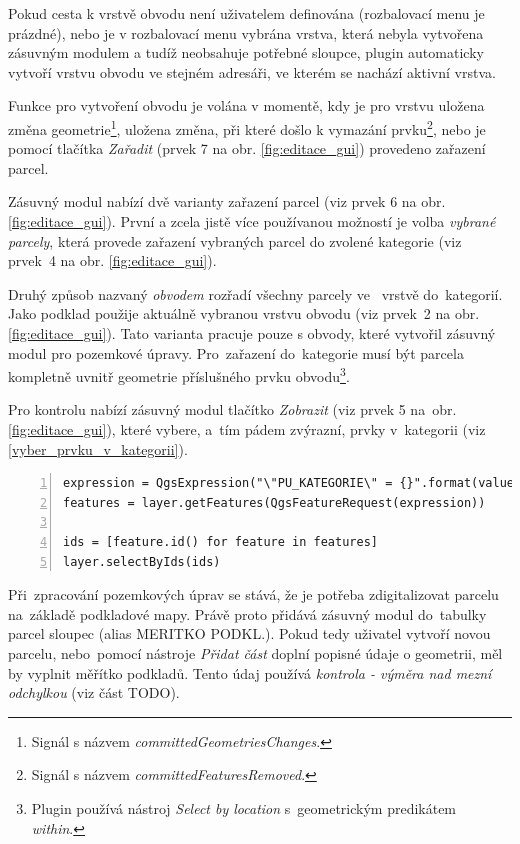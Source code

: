 Pokud cesta k vrstvě obvodu není uživatelem definována (rozbalovací menu je prázdné), nebo je v rozbalovací menu vybrána vrstva, která nebyla vytvořena zásuvným modulem a tudíž neobsahuje potřebné sloupce, plugin automaticky vytvoří vrstvu obvodu ve stejném adresáři, ve kterém se nachází aktivní  vrstva.

Funkce pro vytvoření obvodu je volána v momentě, kdy je pro vrstvu  uložena změna geometrie\footnote{Signál s názvem \textit{committedGeometriesChanges}.}, uložena změna, při které došlo k vymazání prvku\footnote{Signál s názvem \textit{committedFeaturesRemoved}.}, nebo je pomocí tlačítka \textit{Zařadit} (prvek 7 na obr. \ref{fig:editace_gui}) provedeno zařazení parcel.

Zásuvný modul nabízí dvě varianty zařazení parcel (viz prvek 6 na obr. \ref{fig:editace_gui}). První a zcela jistě více používanou možností je volba \textit{vybrané parcely}, která provede zařazení vybraných parcel do zvolené kategorie (viz prvek~4 na obr. \ref{fig:editace_gui}).

Druhý způsob nazvaný \textit{obvodem} rozřadí všechny parcely ve~ vrstvě do~kategorií. Jako podklad použije aktuálně vybranou vrstvu obvodu (viz prvek~2 na obr. \ref{fig:editace_gui}). Tato varianta pracuje pouze s obvody, které vytvořil zásuvný modul pro pozemkové úpravy. Pro~zařazení do~kategorie musí být parcela kompletně uvnitř geometrie příslušného prvku obvodu\footnote{Plugin používá nástroj \textit{Select by location} s~geometrickým predikátem \textit{within}.}.

Pro kontrolu nabízí zásuvný modul tlačítko \textit{Zobrazit} (viz prvek 5 na~obr. \ref{fig:editace_gui}), které vybere, a~tím pádem zvýrazní, prvky v~kategorii (viz \ref{vyber_prvku_v_kategorii}).

{\scriptsize
\begin{lstlisting}[style=python, caption={Výběr prvků v kategorii parcel}, captionpos=b, label=vyber_prvku_v_kategorii, backgroundcolor = \color{light-gray},  numbers=left]
expression = QgsExpression("\"PU_KATEGORIE\" = {}".format(value))
features = layer.getFeatures(QgsFeatureRequest(expression))

ids = [feature.id() for feature in features]
layer.selectByIds(ids)
\end{lstlisting}}

Při~zpracování pozemkových úprav se stává, že je potřeba zdigitalizovat parcelu na~základě podkladové mapy. Právě proto přidává zásuvný modul do~tabulky parcel sloupec  (alias MERITKO PODKL.). Pokud tedy uživatel vytvoří novou parcelu, nebo~pomocí nástroje \textit{Přidat část} doplní popisné údaje o geometrii, měl by vyplnit měřítko podkladů. Tento údaj používá \textit{kontrola - výměra nad mezní odchylkou} (viz část TODO).


